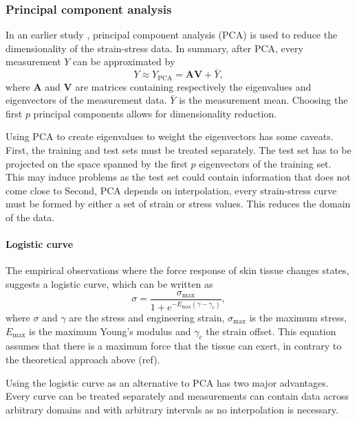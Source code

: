 \subsubsection{Principal component analysis}
In an earlier study , principal component analysis (PCA) is used to reduce the dimensionality of the strain-stress data.
In summary, after PCA, every measurement $Y$ can be approximated by
\begin{equation}\label{eq:pca}
    Y \approx Y_\mathrm{PCA} = \mathbf{A} \mathbf{V} + \bar{Y},
\end{equation}
where $\mathbf{A}$ and $\mathbf{V}$ are matrices containing respectively the eigenvalues and eigenvectors of the measurement data.
$\bar{Y}$ is the measurement mean.
Choosing the first $p$ principal components allows for dimensionality reduction.

Using PCA to create eigenvalues to weight the eigenvectors has some caveats.
First, the training and test sets must be treated separately.
The test set has to be projected on the space spanned by the first $p$ eigenvectors of the training set.
This may induce problems as the test set could contain information that does not come close to
Second, PCA depends on interpolation, \ie every strain-stress curve must be formed by either a set of strain or stress values.
This reduces the domain of the data.

\paragraph{Logistic curve}
The empirical observations where the force response of skin tissue changes states, suggests a logistic curve, which can be written as
\begin{equation}\label{eq:logistic_curve}
    \sigma = \frac{\sigma_\mathrm{max}}{1+e^{-E_\mathrm{max} (\gamma - \gamma_c)}},
\end{equation}
where $\sigma$ and $\gamma$ are the stress and engineering strain, $\sigma_\mathrm{max}$ is the maximum stress, $E_\mathrm{max}$ is the maximum Young's modulus and $\gamma_c$ the strain offset.
This equation assumes that there is a maximum force that the tissue can exert, in contrary to the theoretical approach above (ref).

Using the logistic curve as an alternative to PCA has two major advantages.
Every curve can be treated separately and measurements can contain data across arbitrary domains and with arbitrary intervals as no interpolation is necessary.


